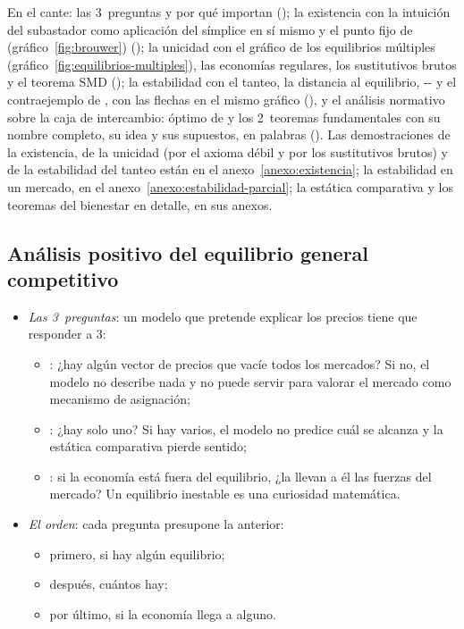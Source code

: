 \documentclass[11pt]{article}
\begin{document}
\begin{notaopositor}
En el cante: las 3~preguntas y por qué importan (); la existencia con la intuición del subastador como aplicación del símplice en sí mismo y el punto fijo de  (gráfico~\ref{fig:brouwer}) (); la unicidad con el gráfico de los equilibrios múltiples (gráfico~\ref{fig:equilibrios-multiples}), las economías regulares, los sustitutivos brutos y el teorema SMD (); la estabilidad con el tanteo, la distancia al equilibrio, -- y el contraejemplo de , con las flechas en el mismo gráfico (), y el análisis normativo sobre la caja de intercambio: óptimo de  y los 2~teoremas fundamentales con su nombre completo, su idea y sus supuestos, en palabras (). Las demostraciones de la existencia, de la unicidad (por el axioma débil y por los sustitutivos brutos) y de la estabilidad del tanteo están en el anexo~\ref{anexo:existencia}; la estabilidad en un mercado, en el anexo~\ref{anexo:estabilidad-parcial}; la estática comparativa y los teoremas del bienestar en detalle, en sus anexos.
\end{notaopositor}

\subsection{Análisis positivo del equilibrio general competitivo}\label{sec:analisis-positivo-equilibrio}

\begin{itemize}
\item \emph{Las 3~preguntas}: un modelo que pretende explicar los precios tiene que responder a 3:
  \begin{itemize}
  \item {}: ¿hay algún vector de precios que vacíe todos los mercados? Si no, el modelo no describe nada y no puede servir para valorar el mercado como mecanismo de asignación;
  \item {}: ¿hay solo uno? Si hay varios, el modelo no predice cuál se alcanza y la estática comparativa pierde sentido;
  \item {}: si la economía está fuera del equilibrio, ¿la llevan a él las fuerzas del mercado? Un equilibrio inestable es una curiosidad matemática.
  \end{itemize}
\item \emph{El orden}: cada pregunta presupone la anterior:
  \begin{itemize}
  \item primero, si hay algún equilibrio;
  \item después, cuántos hay;
  \item por último, si la economía llega a alguno.
  \end{itemize}
\end{itemize}
\end{document}
